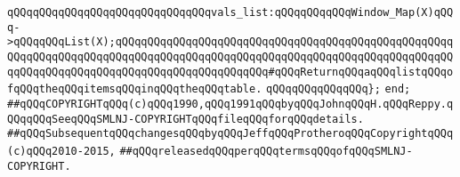 \newline
\verb|qQQqqQQqqQQqqQQqqQQqqQQqqQQqqQQqvals_list:qQQqqQQqqQQqWindow_Map(X)qQQq->qQQqqQQqList(X);qQQqqQQqqQQqqQQqqQQqqQQqqQQqqQQqqQQqqQQqqQQqqQQqqQQqqQQqqQQqqQQqqQQqqQQqqQQqqQQqqQQqqQQqqQQqqQQqqQQqqQQqqQQqqQQqqQQqqQQqqQQqqQQqqQQqqQQqqQQqqQQqqQQqqQQqqQQqqQQqqQQq#qQQqReturnqQQqaqQQqlistqQQqofqQQqtheqQQqitemsqQQqinqQQqtheqQQqtable.|\newline
\verb|qQQqqQQqqQQqqQQq};|\newline
\verb|end;|\newline
\newline
\newline
\verb|##qQQqCOPYRIGHTqQQq(c)qQQq1990,qQQq1991qQQqbyqQQqJohnqQQqH.qQQqReppy.qQQqqQQqSeeqQQqSMLNJ-COPYRIGHTqQQqfileqQQqforqQQqdetails.|\newline
\verb|##qQQqSubsequentqQQqchangesqQQqbyqQQqJeffqQQqProtheroqQQqCopyrightqQQq(c)qQQq2010-2015,|\newline
\verb|##qQQqreleasedqQQqperqQQqtermsqQQqofqQQqSMLNJ-COPYRIGHT.|\newline

